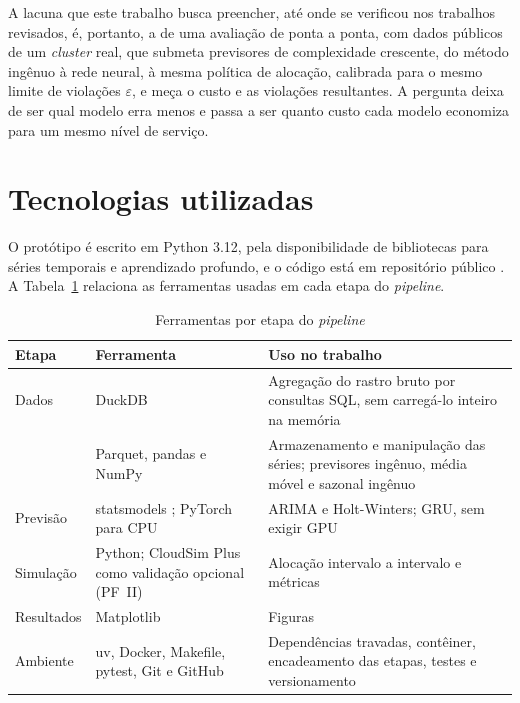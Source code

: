 A lacuna que este trabalho busca preencher, até onde se verificou nos trabalhos revisados, é, portanto, a de uma avaliação de ponta a ponta, com dados públicos de um \textit{cluster} real, que submeta previsores de complexidade crescente, do método ingênuo à rede neural, à mesma política de alocação, calibrada para o mesmo limite de violações $\varepsilon$, e meça o custo e as violações resultantes. A pergunta deixa de ser qual modelo erra menos e passa a ser quanto custo cada modelo economiza para um mesmo nível de serviço.

\section{Tecnologias utilizadas}
\label{sec:tecnologias}

O protótipo é escrito em Python 3.12, pela disponibilidade de bibliotecas para séries temporais e aprendizado profundo, e o código está em repositório público \cite{rosas2026repo}. A Tabela~\ref{tab:tecnologias} relaciona as ferramentas usadas em cada etapa do \textit{pipeline}.

\begin{table}[htbp]
\centering
\caption{Ferramentas por etapa do \textit{pipeline}}
\label{tab:tecnologias}
\renewcommand{\arraystretch}{1.5}
\footnotesize
\begin{tabularx}{\textwidth}{>{\raggedright\arraybackslash}p{1.6cm} >{\raggedright\arraybackslash}p{5.8cm} >{\raggedright\arraybackslash}X}
\toprule
\textbf{Etapa} & \textbf{Ferramenta} & \textbf{Uso no trabalho} \\
\midrule
Dados & DuckDB \cite{raasveldt2019duckdb} & Agregação do rastro bruto por consultas SQL, sem carregá-lo inteiro na memória \\
 & Parquet, pandas \cite{mckinney2010pandas} e NumPy \cite{harris2020numpy} & Armazenamento e manipulação das séries; previsores ingênuo, média móvel e sazonal ingênuo \\
Previsão & statsmodels \cite{seabold2010statsmodels}; PyTorch \cite{paszke2019pytorch} para CPU & ARIMA e Holt-Winters; GRU, sem exigir GPU \\
Simulação & Python; CloudSim Plus \cite{silvafilho2017cloudsimplus} como validação opcional (PF~II) & Alocação intervalo a intervalo e métricas \\
Resultados & Matplotlib \cite{hunter2007matplotlib} & Figuras \\
Ambiente & uv, Docker, Makefile, pytest, Git e GitHub & Dependências travadas, contêiner, encadeamento das etapas, testes e versionamento \\
\bottomrule
\end{tabularx}
\end{table}

